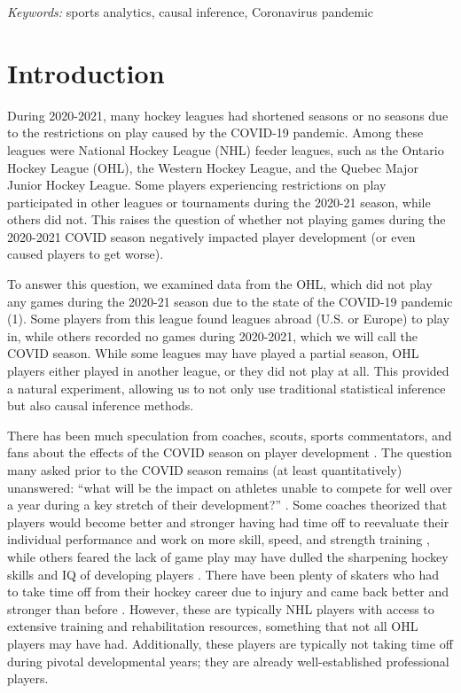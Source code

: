 \documentclass[12pt]{article}
\begin{document}
\noindent%
{\it Keywords:} sports analytics, causal inference, Coronavirus pandemic
\vfill

\newpage
{} %

\hypertarget{introduction}{%
\section{Introduction}\label{introduction}}

During 2020-2021, many hockey leagues had shortened seasons or no
seasons due to the restrictions on play caused by the COVID-19 pandemic.
Among these leagues were National Hockey League (NHL) feeder leagues,
such as the Ontario Hockey League (OHL), the Western Hockey League, and
the Quebec Major Junior Hockey League. Some players experiencing
restrictions on play participated in other leagues or tournaments during
the 2020-21 season, while others did not. This raises the question of
whether not playing games during the 2020-2021 COVID season negatively
impacted player development (or even caused players to get worse).

To answer this question, we examined data from the OHL, which did not
play any games during the 2020-21 season due to the state of the
COVID-19 pandemic (1). Some players from this league found leagues
abroad (U.S. or Europe) to play in, while others recorded no games
during 2020-2021, which we will call the COVID season. While some
leagues may have played a partial season, OHL players either played in
another league, or they did not play at all. This provided a natural
experiment, allowing us to not only use traditional statistical
inference but also causal inference methods.

There has been much speculation from coaches, scouts, sports
commentators, and fans about the effects of the COVID season on player
development \cite{sportsnet, traikos}. The question many asked prior to
the COVID season remains (at least quantitatively) unanswered: ``what
will be the impact on athletes unable to compete for well over a year
during a key stretch of their development?'' \citet{sportsnet}. Some
coaches theorized that players would become better and stronger having
had time off to reevaluate their individual performance and work on more
skill, speed, and strength training \citet{sportsnet}, while others
feared the lack of game play may have dulled the sharpening hockey
skills and IQ of developing players \citet{traikos}. There have been
plenty of skaters who had to take time off from their hockey career due
to injury and came back better and stronger than before
\cite{dixon, kreiser}. However, these are typically NHL players with
access to extensive training and rehabilitation resources, something
that not all OHL players may have had. Additionally, these players are
typically not taking time off during pivotal developmental years; they
are already well-established professional players.
\end{document}
